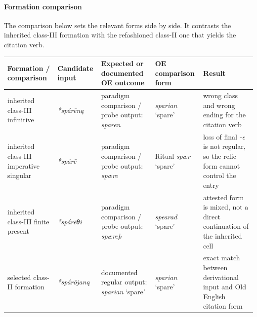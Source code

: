 \documentclass[
  british,
  a4paper,
]{article}
\newcounter{none} %
\providecommand{\Recon}[1]{\emph{*#1}}
\begin{document}
\paragraph{Formation comparison}\label{formation-comparison-3}

The comparison below sets the relevant forms side by side. It contrasts
the inherited class-III formation with the refashioned class-II one that
yields the citation verb.

{\def\LTcaptype{none} %
\begin{longtable}[]{@{}
  >{\raggedright\arraybackslash}p{}
  >{\raggedright\arraybackslash}p{}
  >{\raggedright\arraybackslash}p{}
  >{\raggedright\arraybackslash}p{}
  >{\raggedright\arraybackslash}p{}@{}}
\toprule\noalign{}
\begin{minipage}[b]{\linewidth}\raggedright
Formation / comparison
\end{minipage} & \begin{minipage}[b]{\linewidth}\raggedright
Candidate input
\end{minipage} & \begin{minipage}[b]{\linewidth}\raggedright
Expected or documented OE outcome
\end{minipage} & \begin{minipage}[b]{\linewidth}\raggedright
OE comparison form
\end{minipage} & \begin{minipage}[b]{\linewidth}\raggedright
Result
\end{minipage} \\
\midrule\noalign{}
\endhead
\bottomrule\noalign{}
\endlastfoot
inherited class-III infinitive & {\emph{*spárēną}} & paradigm comparison
/ probe output: {\emph{sparen}} & {\emph{sparian}} `spare' & wrong class
and wrong ending for the citation verb \\
inherited class-III imperative singular & \Recon{spárē} & paradigm
comparison / probe output: {\emph{spære}} & Ritual {\emph{spær}} `spare'
& loss of final \emph{-e} is not regular, so the relic form cannot
control the entry \\
inherited class-III finite present & \Recon{spárēθi} & paradigm
comparison / probe output: {\emph{spæreþ}} & {\emph{spearad}} `spare' &
attested form is mixed, not a direct continuation of the inherited
cell \\
selected class-II formation & {\emph{*spárōjaną}} & documented regular
output: {\emph{sparian}} `spare' & {\emph{sparian}} `spare' & exact
match between derivational input and Old English citation form \\
\end{longtable}
}
\end{document}
